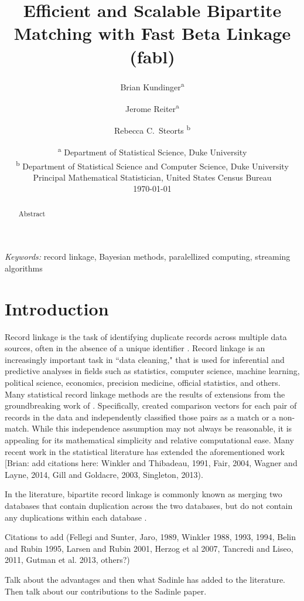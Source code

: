 \documentclass[12pt,letterpaper]{article}
\title{Efficient and Scalable Bipartite Matching with Fast Beta Linkage  (fabl)}
\author{Brian Kundinger\textsuperscript{a} \and
  Jerome Reiter\textsuperscript{a} \and 
  Rebecca C.~Steorts \textsuperscript{b}}
\date{
 \textsuperscript{a} Department of Statistical Science, Duke University \\
 \textsuperscript{b} Department of Statistical Science and Computer Science, Duke University\\Principal Mathematical Statistician, United States Census Bureau\\[2ex]
  \today}
\newcommand{\1}[1]{\mathbb{I}\!\left[#1\right]} %
\def\spacingset#1{\renewcommand{\baselinestretch}%
  {#1}\small\normalsize} \spacingset{1}
\begin{document}
\maketitle

\bigskip
\begin{abstract}
Abstract
\end{abstract}


\noindent%
{\it Keywords:} record linkage, Bayesian methods, paralellized computing, streaming algorithms

\newpage
\spacingset{1.5}

\section{Introduction}
\label{sec:introduction}


Record linkage is the task of identifying duplicate records across multiple data sources, often in the absence of a unique identifier \citep{christen2012data}. Record linkage is an increasingly important task in ``data cleaning," that is used for inferential and predictive analyses in fields such as statistics, computer science, machine learning, political science, economics, precision medicine, official statistics, and others. Many statistical record linkage methods are the results of extensions from the groundbreaking work of \cite{fs, newcombe}. Specifically, \cite{newcombe} created comparison vectors for each pair of records in the data and independently classified those pairs as a match or a non-match. While this independence assumption may not always be reasonable, it is appealing for its mathematical simplicity and relative computational ease. Many recent work in the statistical literature has extended the aforementioned work [Brian: add citations here: Winkler and Thibadeau, 1991, Fair, 2004, Wagner and Layne, 2014, Gill and Goldacre, 2003, Singleton, 2013). 

In the literature, bipartite record linkage is commonly known as merging two databases that contain duplication across the two databases, but do not contain any duplications within each database \citep{sadinle2017}. 

Citations to add (Fellegi and Sunter, Jaro, 1989, Winkler 1988, 1993, 1994, Belin and Rubin 1995, Larsen and Rubin 2001, Herzog et al 2007, Tancredi and Liseo, 2011, Gutman et al. 2013, others?)

Talk about the advantages and then what Sadinle has added to the literature. Then talk about our contributions to the Sadinle paper. 
\end{document}
